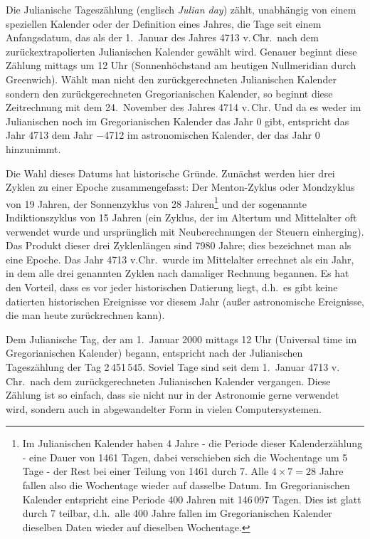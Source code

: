 Die Julianische Tagesz\"ahlung (englisch \textit{Julian day}) z\"ahlt, unabh\"angig von einem 
speziellen Kalender oder der Definition eines Jahres,
die Tage seit einem Anfangsdatum, das als der 1.\ Januar des Jahres 4713 v.\,Chr.\ nach dem
zur\"uckextrapolierten Julianischen Kalender gew\"ahlt wird. Genauer beginnt diese Z\"ahlung mittags
um 12 Uhr (Sonnenh\"ochstand am heutigen Nullmeridian durch Greenwich). W\"ahlt man nicht den
zur\"uckgerechneten Julianischen Kalender sondern den zur\"uckgerechneten Gregorianischen
Kalender, so beginnt diese Zeitrechnung mit dem 24.\ November des Jahres 4714 v.\,Chr. Und da es
weder im Julianischen noch im Gregorianischen Kalender das Jahr 0 gibt, entspricht das Jahr 4713 dem
Jahr $-$4712 im astronomischen Kalender, der das Jahr 0 hinzunimmt. 

Die Wahl dieses Datums hat historische Gr\"unde. Zun\"achst werden hier drei Zyklen zu einer
Epoche zusammengefasst: Der Menton-Zyklus 
oder Mondzyklus von 19 Jahren, der Sonnenzyklus
von 28 Jahren\footnote{Im Julianischen Kalender haben 4 Jahre - die Periode dieser Kalenderz\"ahlung - 
eine Dauer von 1461 Tagen, dabei verschieben
sich die Wochentage um 5 Tage - der Rest bei einer Teilung von 1461 durch 7. 
Alle $4\times 7=28$ Jahre fallen also die Wochentage wieder auf dasselbe Datum. Im
Gregorianischen Kalender entspricht eine Periode 400 Jahren mit 146\,097 Tagen. Dies ist glatt durch 7 teilbar,
d.h.\ alle 400 Jahre fallen im Gregorianischen Kalender dieselben Daten wieder auf dieselben Wochentage.}
und der sogenannte Indiktionszyklus 
von 15 Jahren (ein Zyklus, der im Altertum und Mittelalter
oft verwendet wurde und urspr\"unglich mit Neuberechnungen der Steuern einherging). 
Das Produkt dieser drei Zyklenl\"angen sind
7980 Jahre; dies bezeichnet man als eine Epoche. Das Jahr 4713 v.Chr.\ wurde im Mittelalter errechnet
als ein Jahr, in dem alle drei genannten Zyklen nach damaliger Rechnung begannen. Es hat den Vorteil, dass
es vor jeder historischen Datierung liegt, d.h.\ es gibt keine datierten historischen Ereignisse vor diesem
Jahr (au\ss er astronomische Ereignisse, die man heute zur\"uckrechnen kann). 

Dem Julianische Tag, der am 1.\ Januar 2000 mittags 12 Uhr (Universal time im Gregorianischen Kalender) begann, 
entspricht nach der Julianischen Tagesz\"ahlung  der Tag 2\,451\,545. Soviel Tage sind seit dem 1.\ Januar 4713 v.\,Chr.\
nach dem zur\"uckgerechneten Julianischen Kalender vergangen. Diese Z\"ahlung ist so einfach, dass
sie nicht nur in der Astronomie gerne verwendet wird, sondern auch in abgewandelter
Form in vielen Computersystemen. 

